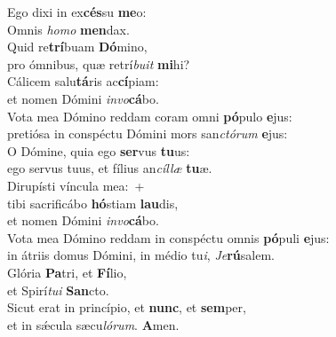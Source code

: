 \evenverse Ego dixi in ex\textbf{cés}su \textbf{me}o:~\*\\
\evenverse Omnis \textit{ho}\textit{mo} \textbf{men}dax.\\
\oddverse Quid re\textbf{trí}buam \textbf{Dó}mino,~\*\\
\oddverse pro ómnibus, quæ retrí\textit{bu}\textit{it} \textbf{mi}hi?\\
\evenverse Cálicem salu\textbf{tá}ris ac\textbf{cí}piam:~\*\\
\evenverse et nomen Dómini \textit{in}\textit{vo}\textbf{cá}bo.\\
\oddverse Vota mea Dómino reddam coram omni \textbf{pó}pulo \textbf{e}jus:~\*\\
\oddverse pretiósa in conspéctu Dómini mors san\textit{ctó}\textit{rum} \textbf{e}jus:\\
\evenverse O Dómine, quia ego \textbf{ser}vus \textbf{tu}us:~\*\\
\evenverse ego servus tuus, et fílius an\textit{cíl}\textit{læ} \textbf{tu}æ.\\
\oddverse Dirupísti víncula mea:~+\\
\oddverse  tibi sacrificábo \textbf{hó}stiam \textbf{lau}dis,~\*\\
\oddverse et nomen Dómini \textit{in}\textit{vo}\textbf{cá}bo.\\
\evenverse Vota mea Dómino reddam in conspéctu omnis \textbf{pó}puli \textbf{e}jus:~\*\\
\evenverse in átriis domus Dómini, in médio tu\textit{i}, \textit{Je}\textbf{rú}salem.\\
\oddverse Glória \textbf{Pa}tri, et \textbf{Fí}lio,~\*\\
\oddverse et Spirí\textit{tu}\textit{i} \textbf{San}cto.\\
\evenverse Sicut erat in princípio, et \textbf{nunc}, et \textbf{sem}per,~\*\\
\evenverse et in sǽcula sæcu\textit{ló}\textit{rum}. \textbf{A}men.\\
